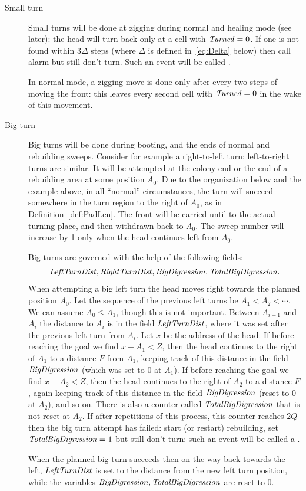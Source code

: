 \documentclass[11pt]{memoir}
\theoremstyle{definition} %
\renewcommand{\le}{\leq}
\newcommand{\fld}[1]{\ensuremath{\textit{#1\/}}}
\newcommand{\F}{F}
\newcommand{\Q}{Q} %
\newcommand{\Z}{Z} %
\newcommand{\bigDigression}{\fld{BigDigression}}
\newcommand{\leftTurnDist}{\fld{LeftTurnDist}}
\newcommand{\rightTurnDist}{\fld{RightTurnDist}}
\newcommand{\totalBigDigression}{\fld{TotalBigDigression}}
\newcommand{\Turned}{\fld{Turned}} %
\begin{document}
\begin{description}
\item[Small turn]
  Small turns will be done at zigging during normal and healing mode (see later): the head
  will turn back only at a cell with \( \Turned=0 \).
  If one is not found within \( 3\Delta \) steps (where \( \Delta \) is defined in~\eqref{eq:Delta} below)
  then call alarm but still don't turn.
  Such an event will be called .

  In normal mode, a zigging move is done only after every two steps of moving the front:
  this leaves every second cell with \( \Turned=0 \) in the wake of this movement.

\item[Big turn]
 Big turns will be done during booting, and the ends of normal and rebuilding sweeps.
  Consider for example a right-to-left turn; left-to-right turns are similar.
  It will be attempted at the colony end or the end of a rebuilding area
  at some position \( A_{0} \).
  Due to the organization below and the example above, in all ``normal'' circumstances,
the turn will succeed somewhere in the turn region to the right of
\( A_{0} \), as in Definition~\ref{def:PadLen}.
The front will be carried until to the actual turning place, and then withdrawn back to \( A_{0} \).
The sweep number will increase by 1 only when the head continues left from \( A_{0} \).

Big turns are governed with the help of the following fields:
\begin{align*}
   \leftTurnDist, \rightTurnDist, \bigDigression, \totalBigDigression.
\end{align*}
When attempting a big left turn the head moves right towards the planned position \( A_{0} \).
Let the sequence of the previous left turns be \( A_{1}<A_{2}<\dotsm \).
We can assume \( A_{0}\le A_{1} \), though this is not important.
Between \( A_{i-1} \) and \( A_{i} \) the distance to \( A_{i} \) is in the field \( \leftTurnDist \), where it was set
after the previous left turn from \( A_{i} \).
Let \( x \) be the address of the head.
If before reaching the goal we find
\( x-A_{1}< \Z \), then the head continues to the right of \( A_{1} \) to a distance \( \F \)
from \( A_{1} \), keeping track of this distance in the field \( \bigDigression \) (which was set to 0 at \( A_{1} \)).
If before reaching the goal we find
\( x-A_{2}< \Z \), then the head continues to the right of \( A_{2} \) to a distance \( \F \),
again keeping track of this distance in the field \( \bigDigression \) (reset to 0 at \( A_{2} \)), and so on.
There is also a counter called \( \totalBigDigression \) that is not reset at \( A_{2} \).
If after repetitions of this process, this counter
reaches \( 2\Q \) then the big turn attempt has failed: start (or restart) rebuilding,
set \( \totalBigDigression=1 \) but still don't turn: such an event will be called a .

When the planned big turn succeeds then on the way back towards the left, \( \leftTurnDist \) is set to the
distance from the new left turn position, while the variables \( \bigDigression,\totalBigDigression \) are reset to 0.
\end{description}
\end{document}
